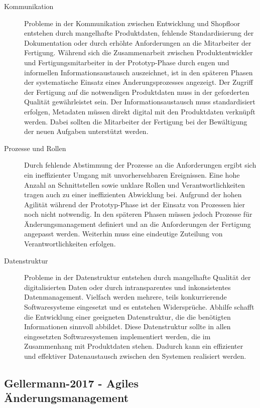 \begin{description}
\item[Kommunikation]
Probleme in der Kommunikation zwischen Entwicklung und Shopfloor entstehen durch mangelhafte Produktdaten, fehlende Standardisierung der Dokumentation oder durch erhöhte Anforderungen an die Mitarbeiter der Fertigung. 
Während sich die Zusammenarbeit zwischen Produktentwickler und Fertigungsmitarbeiter in der Prototyp-Phase durch engen und informellen Informationsaustausch auszeichnet, ist in den späteren Phasen der systematische Einsatz eines Änderungsprozesses angezeigt. Der Zugriff der Fertigung auf die notwendigen Produktdaten muss in der geforderten Qualität gewährleistet sein. Der Informationsaustausch muss standardisiert erfolgen, Metadaten müssen direkt digital mit den Produktdaten verknüpft werden. Dabei sollten die Mitarbeiter der Fertigung bei der Bewältigung der neuen Aufgaben unterstützt werden. 

\item[Prozesse und Rollen]
Durch fehlende Abstimmung der Prozesse an die Anforderungen ergibt sich ein ineffizienter Umgang mit unvorhersehbaren Ereignissen. Eine hohe Anzahl an Schnittstellen sowie unklare Rollen und Verantwortlichkeiten tragen auch zu einer ineffizienten Abwicklung bei. 
Aufgrund der hohen Agilität während der Prototyp-Phase ist der Einsatz von Prozessen hier noch nicht notwendig. In den späteren Phasen müssen jedoch Prozesse für Änderungsmanagement definiert und an die Anforderungen der Fertigung angepasst werden. 
Weiterhin muss eine eindeutige Zuteilung von Verantwortlichkeiten erfolgen. 

\item[Datenstruktur]
Probleme in der Datenstruktur entstehen durch mangelhafte Qualität der digitalisierten Daten oder durch intransparentes und inkonsistentes Datenmanagement. Vielfach werden mehrere, teils konkurrierende Softwaresysteme eingesetzt und es entstehen Widersprüche. 
Abhilfe schafft die Entwicklung einer geeigneten Datenstruktur, die die benötigten Informationen sinnvoll abbildet. Diese Datenstruktur sollte in allen eingesetzten Softwaresystemen implementiert werden, die im Zusammenhang mit Produktdaten stehen. Dadurch kann ein effizienter und effektiver Datenaustausch zwischen den Systemen realisiert werden.  
\end{description}


\subsection*{Gellermann-2017 - Agiles Änderungsmanagement}

